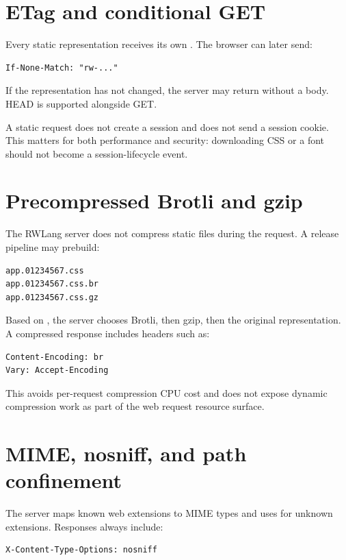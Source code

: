 \section{ETag and conditional GET}

Every static representation receives its own . The browser can later send:

\begin{lstlisting}
If-None-Match: "rw-..."
\end{lstlisting}

If the representation has not changed, the server may return  without a body. HEAD is supported alongside GET.

A static request does not create a session and does not send a session cookie. This matters for both performance and security: downloading CSS or a font should not become a session-lifecycle event.

\section{Precompressed Brotli and gzip}

The RWLang server does not compress static files during the request. A release pipeline may prebuild:

\begin{lstlisting}
app.01234567.css
app.01234567.css.br
app.01234567.css.gz
\end{lstlisting}

Based on , the server chooses Brotli, then gzip, then the original representation. A compressed response includes headers such as:

\begin{lstlisting}
Content-Encoding: br
Vary: Accept-Encoding
\end{lstlisting}

This avoids per-request compression CPU cost and does not expose dynamic compression work as part of the web request resource surface.

\section{MIME, nosniff, and path confinement}

The server maps known web extensions to MIME types and uses  for unknown extensions. Responses always include:

\begin{lstlisting}
X-Content-Type-Options: nosniff
\end{lstlisting}

